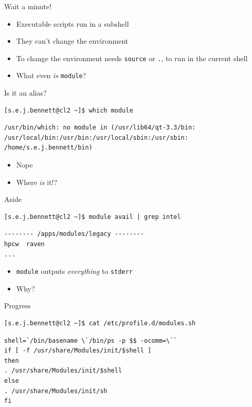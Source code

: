 \documentclass[handout]{beamer}
\newcommand\module[1][]{\texttt{module\ifthenelse{\equal{#1}{}}{}{ #1}}\xspace}
\begin{document}
\begin{frame}{Wait a minute!}

	\begin{itemize}[<+->]
		\item Executable scripts run in a subshell
		\item They can't change the environment
		\item To change the environment needs \texttt{source} or \texttt{.}, to run in the current shell
		\item What even \emph{is} \module?
	\end{itemize}
\end{frame}

\begin{frame}[fragile]{Is it an alias?}

	\pause
	\begin{verbatim}
[s.e.j.bennett@cl2 ~]$ which module\end{verbatim}\pause\begin{verbatim}
/usr/bin/which: no module in (/usr/lib64/qt-3.3/bin:
/usr/local/bin:/usr/bin:/usr/local/sbin:/usr/sbin:
/home/s.e.j.bennett/bin)
\end{verbatim}

	\pause
	\begin{itemize}[<+->]
		\item Nope
		\item Where \emph{is} it!?
	\end{itemize}
\end{frame}

\begin{frame}[fragile]{Aside}
	
	\begin{verbatim}		
[s.e.j.bennett@cl2 ~]$ module avail | grep intel\end{verbatim}\pause\begin{verbatim}
-------- /apps/modules/legacy --------
hpcw  raven
...
\end{verbatim}

	\begin{itemize}[<+->]
		\item \module outputs \emph{everything} to \texttt{stderr}
		\item Why?
			
	\end{itemize}

\end{frame}

\begin{frame}[fragile]{Progress}
	
	\begin{verbatim}
[s.e.j.bennett@cl2 ~]$ cat /etc/profile.d/modules.sh\end{verbatim}\pause\begin{verbatim}
shell=`/bin/basename \`/bin/ps -p $$ -ocomm=\``
if [ -f /usr/share/Modules/init/$shell ]
then
. /usr/share/Modules/init/$shell
else
. /usr/share/Modules/init/sh
fi\end{verbatim}
\end{frame}
\end{document}
